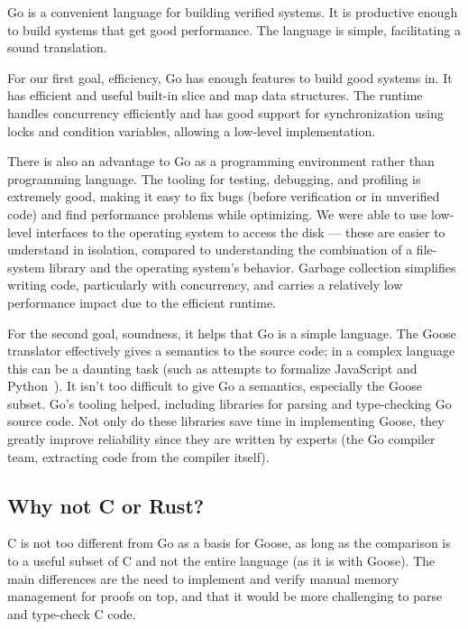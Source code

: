 Go is a convenient language for building verified systems. It is productive
enough to build systems that get good performance. The language is simple,
facilitating a sound translation.

For our first goal, efficiency, Go has enough features to build good systems
in. It has efficient and useful built-in slice and map data structures. The
runtime handles concurrency efficiently and has good support for synchronization
using locks and condition variables, allowing a low-level implementation.

There is also an advantage to Go as a programming environment rather than
programming language. The tooling for testing, debugging, and profiling is
extremely good, making it easy to fix bugs (before verification or in unverified
code) and find performance problems while optimizing. We were able to use
low-level interfaces to the operating system to access the disk --- these are
easier to understand in isolation, compared to understanding the combination of
a file-system library and the operating system's behavior. Garbage collection
simplifies writing code, particularly with concurrency, and carries a relatively
low performance impact due to the efficient runtime.

For the second goal, soundness, it helps that Go is a simple language. The Goose
translator effectively gives a semantics to the source code; in a complex
language this can be a daunting task (such as attempts to formalize JavaScript and
Python~\cite{guha:lambda-js,politz:python-semantics}). It isn't too
difficult to give Go a semantics, especially the Goose subset. Go's tooling
helped, including libraries for parsing and type-checking Go source code. Not
only do these libraries save time in implementing Goose, they greatly improve
reliability since they are written by experts (the Go compiler team, extracting
code from the compiler itself).

\subsection{Why not C or Rust?}

C is not too different from Go as a basis for Goose, as long as the comparison
is to a useful subset of C and not the entire language (as it is with Goose).
The main differences are
the need to implement and verify manual memory management for proofs on top, and
that it would be more challenging to parse and type-check C code.

